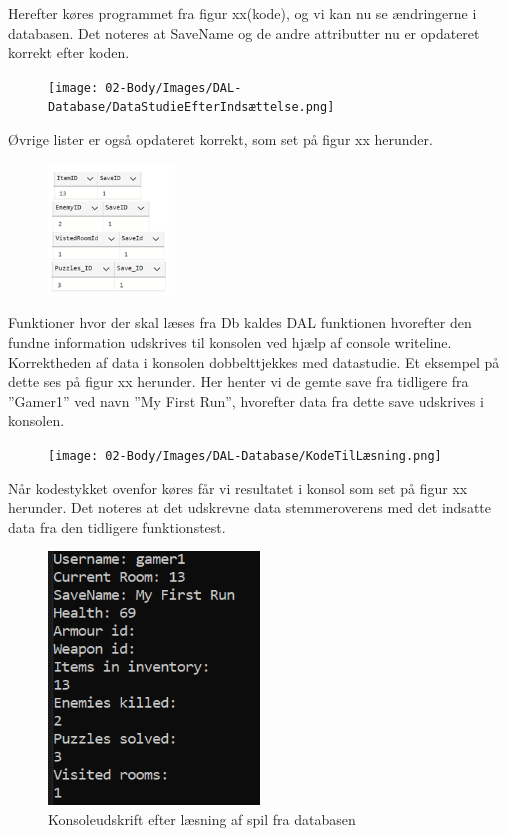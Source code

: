 Herefter køres programmet fra figur xx(kode), og vi kan nu se ændringerne i databasen.
Det noteres at SaveName og de andre attributter nu er opdateret korrekt efter koden.

\begin{figure}[H]
\centering
\texttt{[image: 02-Body/Images/DAL-Database/DataStudieEfterIndsættelse.png]}
\caption{}
\label{fig:}
\end{figure}

Øvrige lister er også opdateret korrekt, som set på figur xx herunder.

\begin{figure}[H]
\centering
\includegraphics[width = 0.3\textwidth]{02-Body/Images/DAL-Database/Lister.png}
\caption{}
\label{fig:}
\end{figure}

Funktioner hvor der skal læses fra Db kaldes DAL funktionen hvorefter den fundne information udskrives til konsolen ved hjælp af console writeline. Korrektheden af data i konsolen dobbelttjekkes med datastudie.
Et eksempel på dette ses på figur xx herunder.
Her henter vi de gemte save fra tidligere fra ”Gamer1” ved navn ”My First Run”, hvorefter data fra dette save udskrives i konsolen.

\begin{figure}[H]
\centering
\texttt{[image: 02-Body/Images/DAL-Database/KodeTilLæsning.png]}
\caption{}
\label{fig:KodeTilLæsningAfSave}
\end{figure}

Når kodestykket ovenfor køres får vi resultatet i konsol som set på figur xx herunder.
Det noteres at det udskrevne data stemmeroverens med det indsatte data fra den tidligere funktionstest.

\begin{figure}[H]
\centering
\includegraphics[width = 0.5\textwidth]{02-Body/Images/DAL-Database/ConsoleOutput.png}
\caption{Konsoleudskrift efter læsning af spil fra databasen}
\label{fig:Modulttest-consoleOutput}
\end{figure}


